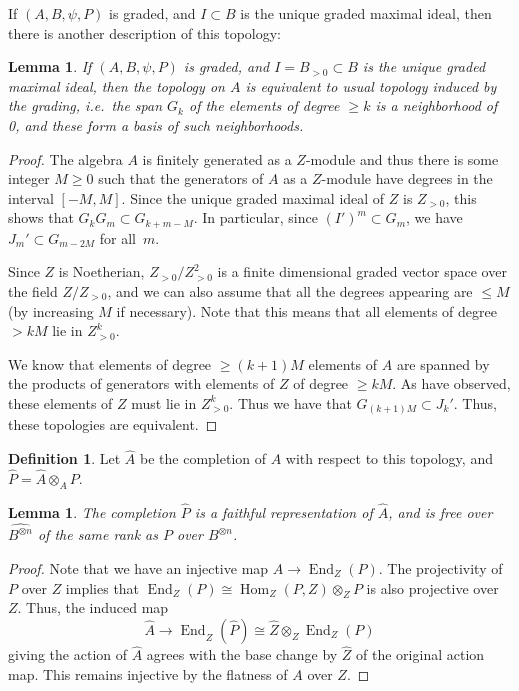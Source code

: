 \documentclass[10pt]{article}
\newtheorem{lemma}[theorem]{Lemma}
\theoremstyle{definition}
\newtheorem{defi}[theorem]{Definition}
\providecommand{\ie}{i.e.\ }
\DeclareMathOperator{\End}{End}
\DeclareMathOperator{\Hom}{Hom}
\begin{document}
 If $(A,B,\psi,P)$ is graded, and $I\subset B$ is the unique graded
 maximal ideal, then there is another description of this topology:
 \begin{lemma}\label{lem:grading-equivalent}
 If $(A,B,\psi,P)$ is graded, and $I=B_{>0}\subset B$ is the unique graded
 maximal ideal, then the topology on $A$ is equivalent to usual
 topology induced by the grading, \ie the span $G_k$ of the elements of
 degree $\geq k$ is a neighborhood of 0, and these form a basis of
 such neighborhoods.
\end{lemma}
\begin{proof}
The algebra $A$ is finitely generated as a
$Z$-module and thus there is some integer
$M\geq 0$ such that the generators of $ A$ as a $Z$-module have
degrees in the interval $[-M,M]$. Since the unique graded maximal
ideal of $Z$ is $Z_{>0}$, 
this shows that $G_kG_{m}\subset G_{k+m-M}$. In particular, since $(I')^m\subset G_m$, we have $J_m'\subset G_{m-2M}$
for all~$m$.

Since $Z$ is Noetherian,
$Z_{>0}/Z_{>0}^2$ is a finite dimensional graded vector space over the field $Z/Z_{>0}$, and
we can also assume that all the degrees appearing are $\leq M$ (by
increasing $M$ if necessary). Note
that this means that all elements of degree $>kM$ lie in $Z_{>0}^k$. 

We know that elements of degree $\geq (k+1)M$
elements of $A$ are spanned by the products of generators with
elements of $Z$ of degree $\geq kM$. As have observed, these elements
of $Z$ must lie in $Z_{>0}^k$. Thus we have that $G_{(k+1)M}\subset J_k'$.
Thus, these
topologies are equivalent. 
\end{proof}
 \begin{defi}
 Let $\widehat{A}$ be the completion of $A$ with respect to this
 topology, and $\widehat{P}=\widehat{A}\otimes_AP$. 
 \end{defi}

 \begin{lemma}\label{lem:faithful-completion}
 The completion $\widehat{P}$ is a faithful representation of
 $\widehat{A}$, and is free over $\widehat{B^{\otimes n}}$ of the
 same rank as $P$ over $B^{\otimes n}$. 
 \end{lemma}
 \begin{proof}
Note that we have an injective map
$A\to \End_{Z}(P)$. The projectivity of $P$
over $Z$ implies that $ \End_{Z}(P)\cong \Hom_Z(P,Z)\otimes_Z P$ is also
projective over $Z$.
Thus, the induced map
\[\widehat{A}\to \End_{\widehat{Z}}(\widehat{P})\cong
 \widehat{{Z}}\otimes_{Z}\End_{{Z}}(P)
\]
giving the action of $\widehat{A}$ agrees with the base change by
$\widehat{Z}$ of the original action map. This remains injective by
the flatness of $A$ over $Z$. 
 \end{proof}
\end{document}
